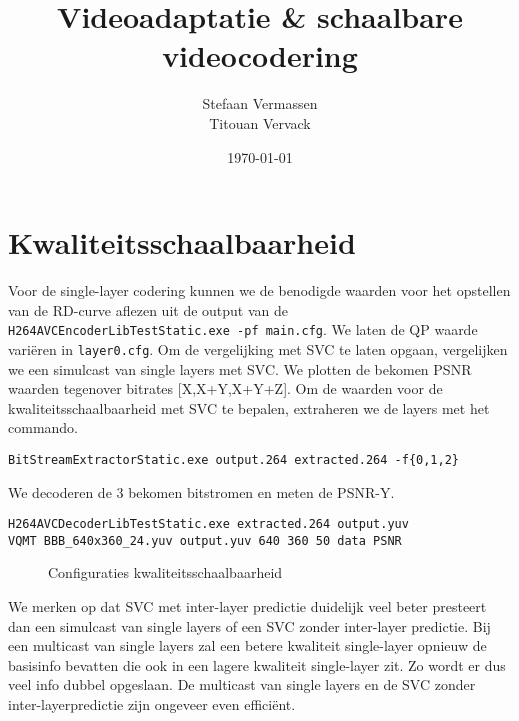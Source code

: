 \documentclass[12pt,a4paper,oneside]{article}
\begin{document}
\title{Videoadaptatie \& schaalbare videocodering}
\author{Stefaan Vermassen \\
	     Titouan Vervack}
\date{\today}
\pagestyle{fancy}
\fancyhf{}
\fancyfoot[C]{\thepage}
\maketitle
\section{Kwaliteitsschaalbaarheid}
Voor de single-layer codering kunnen we de benodigde waarden voor het opstellen van de RD-curve aflezen uit de output van de \verb$H264AVCEncoderLibTestStatic.exe -pf main.cfg$. We laten de QP waarde vari\"eren in \verb$layer0.cfg$. Om de vergelijking met SVC te laten opgaan, vergelijken we een simulcast van single layers met SVC. We plotten de bekomen PSNR waarden tegenover bitrates [X,X+Y,X+Y+Z].
Om de waarden voor de kwaliteitsschaalbaarheid met SVC te bepalen, extraheren we de layers met het commando.
\begin{verbatim}
BitStreamExtractorStatic.exe output.264 extracted.264 -f{0,1,2}
\end{verbatim}
We decoderen de 3 bekomen bitstromen en meten de PSNR-Y.
\begin{verbatim}
H264AVCDecoderLibTestStatic.exe extracted.264 output.yuv
VQMT BBB_640x360_24.yuv output.yuv 640 360 50 data PSNR
\end{verbatim}
\begin{figure}[H]
  \begin{center}
    
    \caption{Configuraties kwaliteitsschaalbaarheid}
    \label{graph:graph1}
  \end{center}
\end{figure}
We merken op dat SVC met inter-layer predictie duidelijk veel beter presteert dan een simulcast van single layers of een SVC zonder inter-layer predictie. Bij een multicast van single layers zal een betere kwaliteit single-layer opnieuw de basisinfo bevatten die ook in een lagere kwaliteit single-layer zit. Zo wordt er dus veel info dubbel opgeslaan. De multicast van single layers en de SVC zonder inter-layerpredictie zijn ongeveer even effici\"ent.
\end{document}
